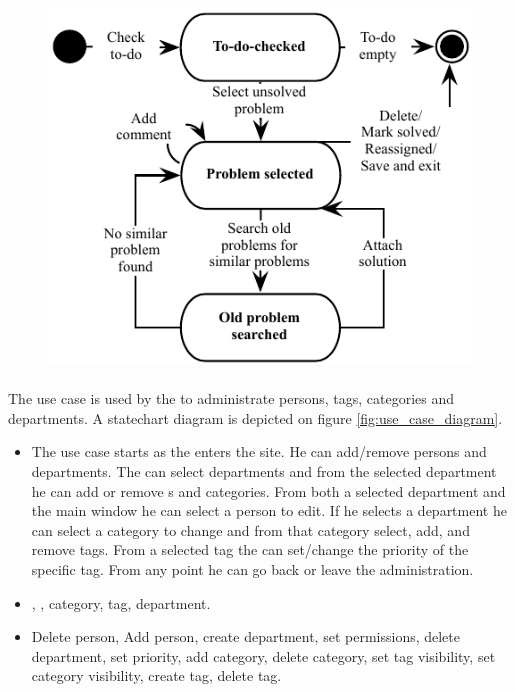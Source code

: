 \begin{figure}[htb]
\begin{center}
 \includegraphics[scale=0.8]{input/application_domain_analysis/solve_problem_use_case}
\label{fig:solve_problem_use_case}
\end{center}
\end{figure}


\paragraph{\tucadmin[c]} The use case \tucadmin[] is used by the \sadmin[] to administrate persons, tags, categories and departments. A statechart diagram is depicted on figure \ref{fig:use_case_diagram}.

\begin{itemize}
\item{} The use case starts as the \sadmin{} enters the site. He can add/remove persons and departments. The \sadmin{} can select departments and from the selected department he can add or remove \staff[]s and categories. From both a selected department and the main window he can select a person to edit. 
If he selects a department he can select a category to change and from that category select, add, and remove tags. 
From a selected tag the \sadmin{} can set/change the priority of the specific tag. From any point he can go back or leave the administration. 

\item{} \staff[c], \client[c], category, tag, department.

\item{} Delete person, Add person, create department, set permissions, delete department, set priority, add category, delete category, set tag visibility, set category visibility, create tag, delete tag.
\end{itemize}



